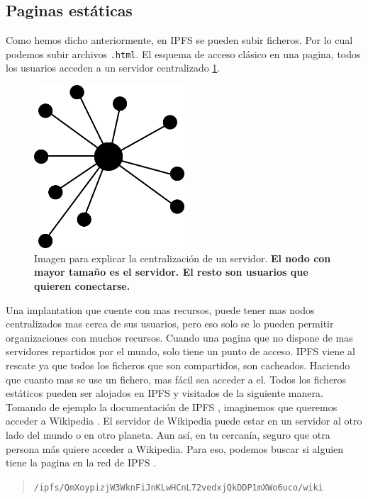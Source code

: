 \subsection{Paginas estáticas}
Como hemos dicho anteriormente, en IPFS \cite{web:ipfs} se pueden subir ficheros. Por lo cual podemos subir archivos \verb|.html|.
El esquema de acceso clásico en una pagina, todos los usuarios acceden a un servidor centralizado \ref{fg:centralizado}.
\begin{figure}[h!]
    \centering
    \includegraphics[width=0.5\textwidth]{Figures/Centralizado.png}
    \caption{Imagen para explicar la centralización de un servidor. \textbf{El nodo con mayor tamaño es el servidor. El resto son usuarios que quieren conectarse.}}
    \label{fg:centralizado}
\end{figure}
Una implantation que cuente con mas recursos, puede tener mas nodos centralizados mas cerca de sus usuarios, pero eso solo se lo pueden permitir organizaciones con muchos recursos.
Cuando una pagina que no dispone de mas servidores repartidos por el mundo, solo tiene un punto de acceso. IPFS \cite{web:ipfs} viene al rescate ya que todos los ficheros que son compartidos, son cacheados. Haciendo que cuanto mas se use un fichero, mas fácil sea acceder a el.
Todos los ficheros estáticos pueden ser alojados en IPFS \cite{web:ipfs} y visitados de la siguiente manera. Tomando de ejemplo la documentación de IPFS \cite{web:ipfs} \cite{web:ipfs_whatis}, imaginemos que queremos acceder a Wikipedia \cite{web:wikipedia_main}.
El servidor de Wikipedia puede estar en un servidor al otro lado del mundo o en otro planeta. Aun así, en tu cercanía, seguro que otra persona más quiere acceder a Wikipedia. Para eso, podemos buscar si alguien tiene la pagina en la red de IPFS \cite{web:ipfs}.
\begin{quote}
    \verb|/ipfs/QmXoypizjW3WknFiJnKLwHCnL72vedxjQkDDP1mXWo6uco/wiki|
\end{quote}
